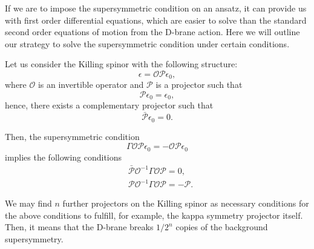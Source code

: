 If we are to impose the supersymmetric condition on an ansatz, it can provide us with first order differential equations, which are easier to solve than the standard second order equations of motion from the D-brane action. Here we will outline our strategy to solve the supersymmetric condition under certain conditions.

Let us consider the Killing spinor with the following structure:
\begin{equation}
\epsilon = \mathcal{O} \mathcal{P} \epsilon_0,
\end{equation}
where $\mathcal{O}$ is an invertible operator and $\mathcal{P}$ is a projector such that
\begin{equation}
    \mathcal{P} \epsilon_0 =  \epsilon_0,
\end{equation}
hence, there exists a complementary projector such that 
\begin{equation}
    \bar{\mathcal{P}} \epsilon_0 =  0.
\end{equation}

Then, the supersymmetric condition
\begin{equation}
 \Gamma \mathcal{O} \mathcal{P} \epsilon_0 = - \mathcal{O} \mathcal{P} \epsilon_0
\end{equation}
implies the following conditions
\begin{align}\label{eq:susyCondition0}
&\bar{\mathcal{P}} \mathcal{O}^{-1} \Gamma \mathcal{O} \mathcal{P}  = 0, \\
&\mathcal{P} \mathcal{O}^{-1} \Gamma \mathcal{O} \mathcal{P} = -\mathcal{P}.
\end{align}


We may find $n$ further projectors on the Killing spinor as necessary conditions for the above conditions to fulfill, for example, the kappa symmetry projector itself. Then, it means that the D-brane breaks $1/2^n$ copies of the background supersymmetry. 
























